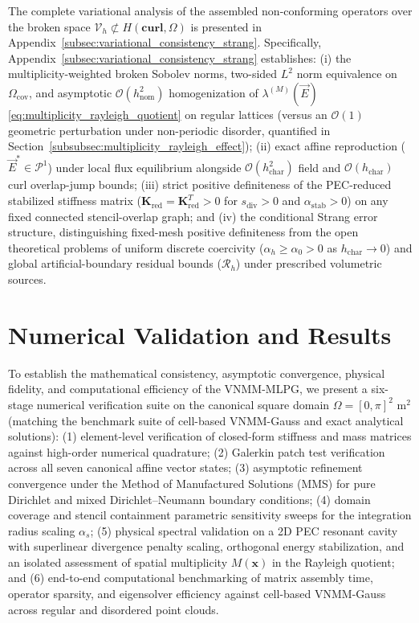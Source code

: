 \documentclass[VANCOUVER,Times1COL]{WileyNJD-v5}
\begin{document}
\begin{remark}
\label{rem:variational_summary}
    The complete variational analysis of the assembled non-conforming operators over the broken space $\mathcal{V}_h \not\subset H(\mathbf{curl}, \Omega)$ is presented in Appendix~\ref{subsec:variational_consistency_strang}. Specifically, Appendix~\ref{subsec:variational_consistency_strang} establishes: (i) the multiplicity-weighted broken Sobolev norms, two-sided $L^2$ norm equivalence on $\Omega_{\mathrm{cov}}$, and asymptotic $\mathcal{O}(h_{\mathrm{nom}}^2)$ homogenization of $\lambda^{(M)}(\vec{E})$ \eqref{eq:multiplicity_rayleigh_quotient} on regular lattices (versus an $\mathcal{O}(1)$ geometric perturbation under non-periodic disorder, quantified in Section~\ref{subsubsec:multiplicity_rayleigh_effect}); (ii) exact affine reproduction ($\vec{E}^* \in \mathcal{P}^1$) under local flux equilibrium alongside $\mathcal{O}(h_{\mathrm{char}}^2)$ field and $\mathcal{O}(h_{\mathrm{char}})$ curl overlap-jump bounds; (iii) strict positive definiteness of the PEC-reduced stabilized stiffness matrix ($\mathbf{K}_{\mathrm{red}} = \mathbf{K}_{\mathrm{red}}^T > 0$ for $s_{\mathrm{div}} > 0$ and $\alpha_{\mathrm{stab}} > 0$) on any fixed connected stencil-overlap graph; and (iv) the conditional Strang error structure, distinguishing fixed-mesh positive definiteness from the open theoretical problems of uniform discrete coercivity ($\alpha_h \ge \alpha_0 > 0$ as $h_{\mathrm{char}} \to 0$) and global artificial-boundary residual bounds ($\mathcal{R}_h$) under prescribed volumetric sources.
\end{remark}

\section{Numerical Validation and Results}
\label{sec:results}

To establish the mathematical consistency, asymptotic convergence, physical fidelity, and computational efficiency of the VNMM-MLPG, we present a six-stage numerical verification suite on the canonical square domain $\Omega = [0, \pi]^2\text{ m}^2$ (matching the benchmark suite of cell-based VNMM-Gauss \cite{stable_vnmm2d_2026} and exact analytical solutions):
(1) element-level verification of closed-form stiffness and mass matrices against high-order numerical quadrature;
(2) Galerkin patch test verification across all seven canonical affine vector states;
(3) asymptotic refinement convergence under the Method of Manufactured Solutions (MMS) for pure Dirichlet and mixed Dirichlet--Neumann boundary conditions;
(4) domain coverage and stencil containment parametric sensitivity sweeps for the integration radius scaling $\alpha_s$;
(5) physical spectral validation on a 2D PEC resonant cavity with superlinear divergence penalty scaling, orthogonal energy stabilization, and an isolated assessment of spatial multiplicity $M(\mathbf{x})$ in the Rayleigh quotient; and
(6) end-to-end computational benchmarking of matrix assembly time, operator sparsity, and eigensolver efficiency against cell-based VNMM-Gauss across regular and disordered point clouds.
\end{document}
